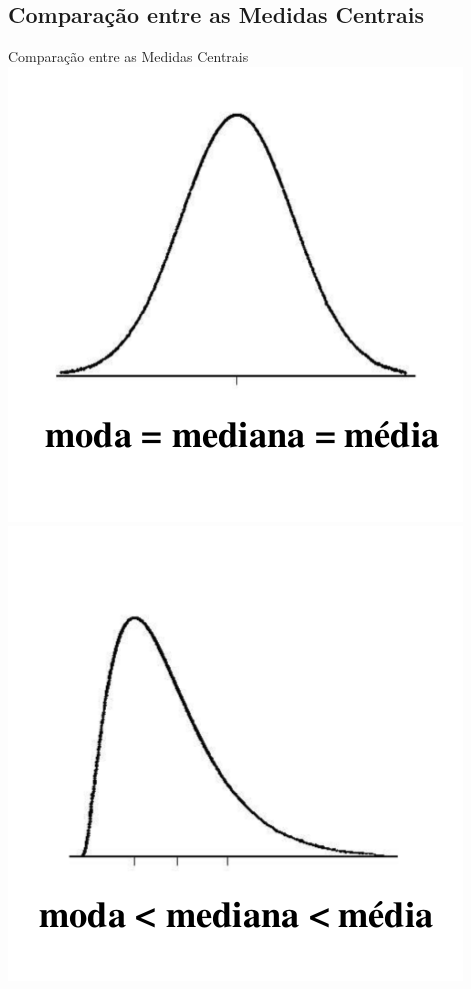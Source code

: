 \documentclass{beamer}
\begin{document}
\subsection[Comparação]{Comparação entre as Medidas Centrais}

\begin{frame}{Comparação entre as Medidas Centrais}
    \includegraphics[height=0.4\textheight]{medidas1}
    \includegraphics[height=0.4\textheight]{medidas2}

\end{frame}
\end{document}
